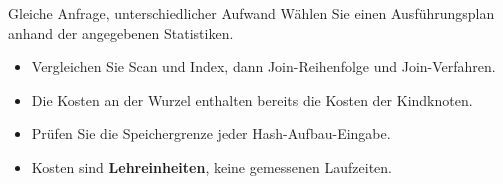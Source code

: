 \begin{frame}[t]{Gleiche Anfrage, unterschiedlicher Aufwand}
Wählen Sie einen Ausführungsplan anhand der angegebenen Statistiken.
\medskip
\begin{itemize}
\item Vergleichen Sie Scan und Index, dann Join-Reihenfolge und Join-Verfahren.
\item Die Kosten an der Wurzel enthalten bereits die Kosten der Kindknoten.
\item Prüfen Sie die Speichergrenze jeder Hash-Aufbau-Eingabe.
\item Kosten sind \textbf{Lehreinheiten}, keine gemessenen Laufzeiten.
\end{itemize}
\end{frame}

